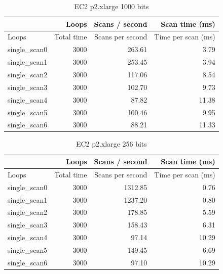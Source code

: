 \begin{table}[!htb]
\centering
\begin{tabular}{| l | r | r | r |}
    \hline
    & Loops & Scans / second & Scan time (ms) \\ \hline
    Loops & Total time & Scans per second & Time per scan (ms) \\
    single\_scan0 & 3000 & 263.61 & 3.79 \\
    single\_scan1 & 3000 & 253.45 & 3.94 \\
    single\_scan2 & 3000 & 117.06 & 8.54 \\
    single\_scan3 & 3000 & 102.70 & 9.73 \\
    single\_scan4 & 3000 & 87.82 & 11.38 \\
    single\_scan5 & 3000 & 100.46 & 9.95 \\
    single\_scan6 & 3000 & 88.21 & 11.33 \\
    \hline
\end{tabular}
\caption{EC2 p2.xlarge 1000 bits
\label{tab:perf-imac-256}}
\end{table}

\begin{table}[!htb]
\centering
\begin{tabular}{| l | r | r | r |}
    \hline
    & Loops & Scans / second & Scan time (ms) \\ \hline
    Loops & Total time & Scans per second & Time per scan (ms) \\
    single\_scan0 & 3000 & 1312.85 & 0.76 \\
    single\_scan1 & 3000 & 1237.20 & 0.80 \\
    single\_scan2 & 3000 & 178.85 & 5.59 \\
    single\_scan3 & 3000 & 158.43 & 6.31 \\
    single\_scan4 & 3000 & 97.14 & 10.29 \\
    single\_scan5 & 3000 & 149.45 & 6.69 \\
    single\_scan6 & 3000 & 97.10 & 10.29 \\
    \hline
\end{tabular}
\caption{EC2 p2.xlarge 256 bits
\label{tab:perf-imac-256}}
\end{table}

